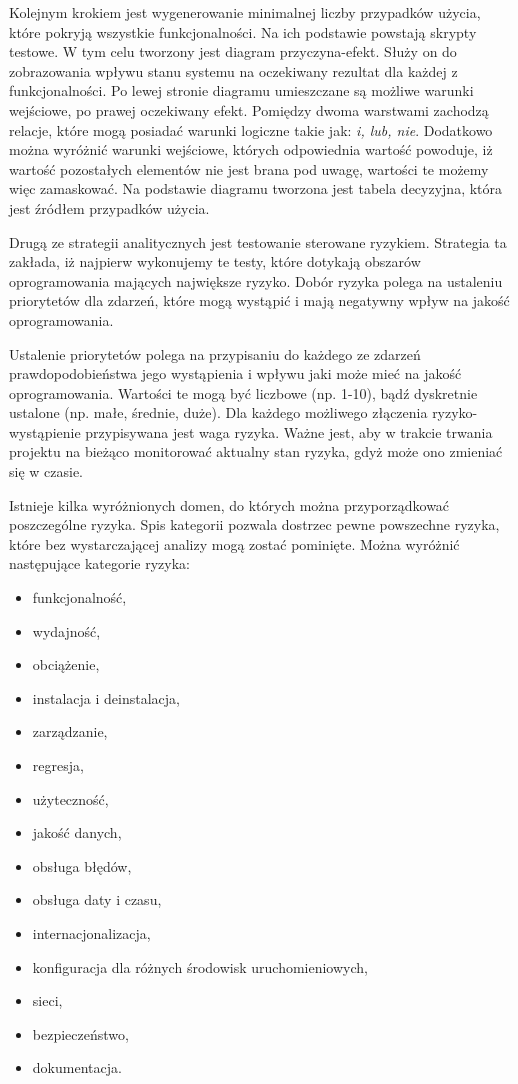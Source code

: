 Kolejnym krokiem jest wygenerowanie minimalnej liczby przypadków użycia, które pokryją wszystkie funkcjonalności. Na ich podstawie powstają skrypty testowe. W tym celu tworzony jest diagram przyczyna-efekt. Służy on do zobrazowania wpływu stanu systemu na oczekiwany rezultat dla każdej z funkcjonalności. Po lewej stronie diagramu umieszczane są możliwe warunki wejściowe, po prawej oczekiwany efekt. Pomiędzy dwoma warstwami zachodzą relacje, które mogą posiadać warunki logiczne takie jak: \textit{i, lub, nie}. Dodatkowo można wyróżnić warunki wejściowe, których odpowiednia wartość powoduje, iż wartość pozostałych elementów nie jest brana pod uwagę, wartości te możemy więc zamaskować. Na podstawie diagramu tworzona jest tabela decyzyjna, która jest źródłem przypadków użycia.

Drugą ze strategii analitycznych jest testowanie sterowane ryzykiem. Strategia ta zakłada, iż najpierw wykonujemy te testy, które dotykają obszarów oprogramowania mających największe ryzyko.  Dobór ryzyka polega na ustaleniu priorytetów dla zdarzeń, które mogą wystąpić i mają negatywny wpływ na jakość oprogramowania.

Ustalenie priorytetów polega na przypisaniu do każdego ze zdarzeń prawdopodobieństwa jego wystąpienia i wpływu jaki może mieć na jakość oprogramowania. Wartości te mogą być liczbowe (np. 1-10), bądź dyskretnie ustalone (np. małe, średnie, duże). Dla każdego możliwego złączenia ryzyko-wystąpienie przypisywana jest waga ryzyka. Ważne jest, aby w trakcie trwania projektu na bieżąco monitorować aktualny stan ryzyka, gdyż może ono zmieniać się w czasie.

Istnieje kilka wyróżnionych domen, do których można przyporządkować poszczególne ryzyka. Spis kategorii pozwala dostrzec pewne powszechne ryzyka, które bez wystarczającej analizy mogą zostać pominięte. Można wyróżnić następujące kategorie ryzyka:

\begin{itemize}
  \item funkcjonalność,
  \item wydajność,
  \item obciążenie,
  \item instalacja i deinstalacja,
  \item zarządzanie,
  \item regresja,
  \item użyteczność,
  \item jakość danych,
  \item obsługa błędów,
  \item obsługa daty i czasu,
  \item internacjonalizacja,
  \item konfiguracja dla różnych środowisk uruchomieniowych,
  \item sieci,
  \item bezpieczeństwo,
  \item dokumentacja.
\end{itemize}

